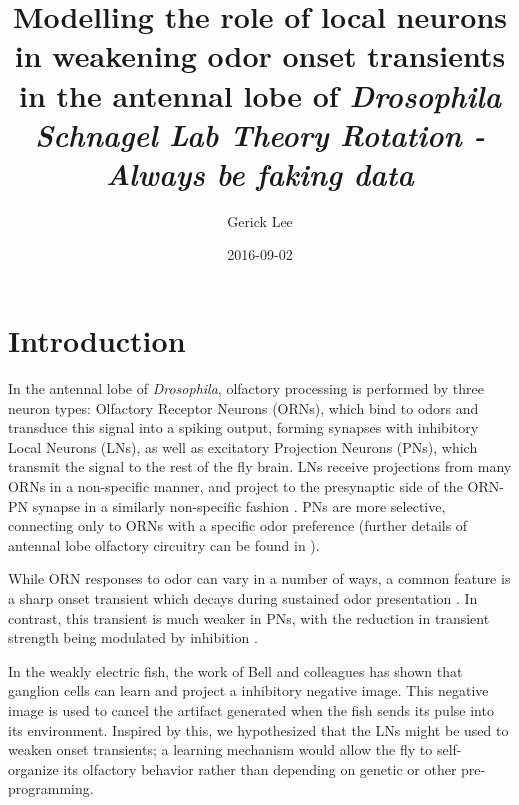 \documentclass[a4paper,12pt,twoside]{article}
\begin{document}
\title{Modelling the role of local neurons in weakening odor onset transients in the antennal lobe of \textit{Drosophila}\\
  \large \textit{Schnagel Lab Theory Rotation - Always be faking data}}
\author{Gerick Lee}
\date{2016-09-02}
\maketitle
\section{Introduction}
In the antennal lobe of \textit{Drosophila}, olfactory processing is performed by three neuron types: Olfactory Receptor Neurons (ORNs), which bind to odors and transduce this signal into a spiking output, forming synapses with inhibitory Local Neurons (LNs), as well as excitatory Projection Neurons (PNs), which transmit the signal to the rest of the fly brain.  LNs receive projections from many ORNs in a non-specific manner, and project to the presynaptic side of the ORN-PN synapse in a similarly non-specific fashion \cite{Nagel2015}.  PNs are more selective, connecting only to ORNs with a specific odor preference (further details of antennal lobe olfactory circuitry can be found in \citet{Wilson2013}).

While ORN responses to odor can vary in a number of ways, a common feature is a sharp onset transient which decays during sustained odor presentation \cite{Nagel2011}.  In contrast, this transient is much weaker in PNs, with the reduction in transient strength being modulated by inhibition \cite{Nagel2015}.

In the weakly electric fish, the work of Bell and colleagues has shown that ganglion cells can learn and project a inhibitory negative image\cite{Bell1993, Bell2000,  Bell1981, Kennedy2014}.  This negative image is used to cancel the artifact generated when the fish sends its pulse into its environment. Inspired by this, we hypothesized that the LNs might be used to weaken onset transients; a learning mechanism would allow the fly to self-organize its olfactory behavior rather than depending on genetic or other pre-programming.  
\end{document}
